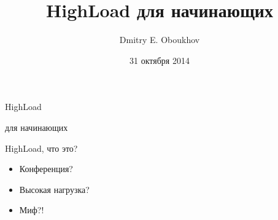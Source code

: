 \documentclass[aspectratio=169]{beamer}
\title{HighLoad для начинающих}
\author{Dmitry E. Oboukhov}
\date{31 октября 2014}
\begin{document}

\begin{frame}
    \begin{block}
        {\huge HighLoad}
        \par
        {\huge для начинающих}
    \end{block}
\end{frame}


\maketitle

\begin{frame}{HighLoad, что это?}
    \begin{itemize}

        \item Конференция?

        \pause
        \item Высокая нагрузка?

        \pause
        \item Миф?!

    \end{itemize}
\end{frame}
\end{document}
